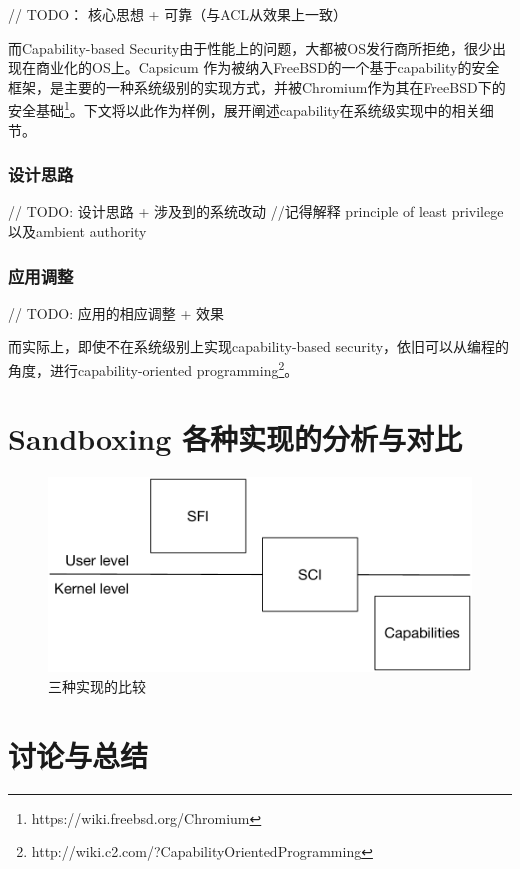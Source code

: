 \documentclass[final,12pt]{elsarticle}
\begin{document}
// TODO： 核心思想 + 可靠（与ACL从效果上一致）

而Capability-based Security由于性能上的问题，大都被OS发行商所拒绝，很少出现在商业化的OS上。Capsicum \cite{capsicum} 作为被纳入FreeBSD的一个基于capability的安全框架，是主要的一种系统级别的实现方式，并被Chromium作为其在FreeBSD下的安全基础\footnote{https://wiki.freebsd.org/Chromium}。下文将以此作为样例，展开阐述capability在系统级实现中的相关细节。

\subsubsection{设计思路}
\label{sss:design}

// TODO: 设计思路 + 涉及到的系统改动
//记得解释 principle of least privilege以及ambient authority

\subsubsection{应用调整}
\label{sss:adoption}

// TODO: 应用的相应调整 + 效果

而实际上，即使不在系统级别上实现capability-based security，依旧可以从编程的角度，进行capability-oriented programming\footnote{http://wiki.c2.com/?CapabilityOrientedProgramming}。

\section{Sandboxing 各种实现的分析与对比}
\label{s:evaluation}


\begin{figure}
\centering
\includegraphics[width=0.7\linewidth]{imgs/difference}
\caption{三种实现的比较}
\label{fig:difference}
\end{figure}

\section{讨论与总结}
\label{s:tucao}
\end{document}
